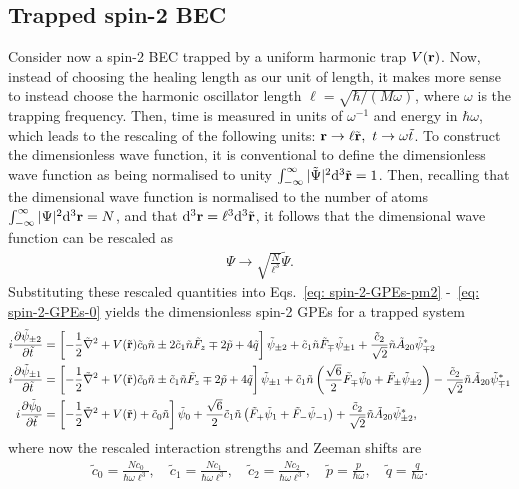 \subsection{Trapped spin-2 BEC}\label{subsec: spin-2-dimensionless}
Consider now a spin-2 BEC trapped by a uniform harmonic trap \(V(\vb{r})\).
Now, instead of choosing the healing length as our unit of length, it makes more
sense to instead choose the harmonic oscillator length \(\ell =
\sqrt{\hbar/(M\omega)}\), where \(\omega \) is the trapping frequency.
Then, time is measured in units of \(\omega^{-1}\) and energy in
\(\hbar\omega \), which leads to the rescaling of the following units:
\(\vb{r}\rightarrow \ell\tilde{\vb{r}},\ t \rightarrow \omega\tilde{t}\).
To construct the dimensionless wave function, it is conventional to define the
dimensionless wave function as being normalised to unity
\(\int_{-\infty}^\infty |\tilde{\Psi}|^2\dd^3\tilde{\vb{r}} = 1\).
Then, recalling that the dimensional wave function is normalised to the number
of atoms \(\int_{-\infty}^\infty |{\Psi}|^2\dd^3{\vb{r}} = N\), and that
\(\dd^3\vb{r} = \ell^3\dd^3\tilde{\vb{r}}\), it follows that the dimensional
wave function can be rescaled as
\begin{align}
    \Psi \rightarrow \sqrt{\frac{N}{\ell^3}}\tilde{\Psi}.
\end{align}
Substituting these rescaled quantities into Eqs.~\eqref{eq: spin-2-GPEs-pm2}
-~\eqref{eq: spin-2-GPEs-0} yields the dimensionless spin-2 GPEs for a trapped
system
\begin{align}
    i\pdv{\tilde{\psi}_{\pm 2}}{\tilde{t}} &= \left[-\frac{1}{2}\tilde{\nabla}^2
    +V(\tilde{\vb{r}}) \tilde{c}_0\tilde{n} \pm 2\tilde{c}_1\tilde{n}\tilde{F}_z
    \mp 2\tilde{p} + 4\tilde{q}\right]\tilde{\psi}_{\pm 2}
    + \tilde{c}_1\tilde{n}\tilde{F}_\mp\tilde{\psi}_{\pm 1}
    + \frac{\tilde{c}_2}{\sqrt{2}}\tilde{n}\tilde{A}_{20}\tilde{\psi}_{\mp 2}^*
    \\
    i\pdv{\tilde{\psi}_{\pm 1}}{\tilde{t}} &= \left[-\frac{1}{2}\tilde{\nabla}^2
    +V(\tilde{\vb{r}}) \tilde{c}_0\tilde{n} \pm \tilde{c}_1\tilde{n}\tilde{F}_z
    \mp 2\tilde{p} + 4\tilde{q}\right]\tilde{\psi}_{\pm 1}
    +\tilde{c}_1\tilde{n}\left(\frac{\sqrt{6}}{2}\tilde{F}_\mp \tilde{\psi}_0
    +\tilde{F}_\pm\tilde{\psi}_{\pm 2}\right)
    - \frac{\tilde{c}_2}{\sqrt{2}}\tilde{n}\tilde{A}_{20}\tilde{\psi}_{\mp 1}^*
    \\
    i\pdv{\tilde{\psi}_0}{\tilde{t}} &= \left[-\frac{1}{2}\tilde{\nabla}^2
    +V(\tilde{\vb{r}})+\tilde{c}_0\tilde{n}\right]\tilde{\psi}_0
    +\frac{\sqrt{6}}{2}\tilde{c}_1\tilde{n}\left(\tilde{F}_+\tilde{\psi}_1
    +\tilde{F}_-\tilde{\psi}_{-1}\right)
    + \frac{\tilde{c}_2}{\sqrt{2}}\tilde{n}\tilde{A}_{20}\tilde{\psi}_{\pm 2}^*,
\end{align}
where now the rescaled interaction strengths and Zeeman shifts are
\begin{align}\label{eq: spin-2-interaction-strengths-dimensionless}
    \tilde{c}_0 = \frac{Nc_0}{\hbar\omega\ell^3}, \quad
    \tilde{c}_1 = \frac{Nc_1}{\hbar\omega\ell^3}, \quad
    \tilde{c}_2 = \frac{Nc_2}{\hbar\omega\ell^3}, \quad
    \tilde{p} = \frac{p}{\hbar\omega}, \quad
    \tilde{q} = \frac{q}{\hbar\omega}.
\end{align}

